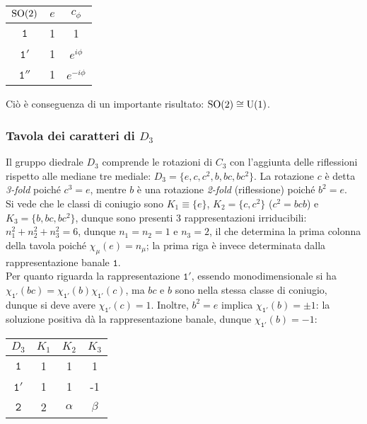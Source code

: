 \begin{table}[H]
	\centering
	\begin{tabular}{c|cc}
		$ \mathrm{SO}(2) $ & $ e $ & $ c_{\phi} $ \\
		\hline
		$ \mathtt{1} $ & 1 & 1 \\
		$ \mathtt{1}' $ & 1 & $ e^{i \phi} $ \\
		$ \mathtt{1}'' $ & 1 & $ e^{-i \phi} $
	\end{tabular}
\end{table}

Ciò è conseguenza di un importante risultato: $ \mathrm{SO}(2) \cong \mathrm{U}(1) $.

\subsubsection{Tavola dei caratteri di \texorpdfstring{$ D_3 $}{TEXT}}

Il gruppo diedrale $ D_3 $ comprende le rotazioni di $ C_3 $ con l'aggiunta delle riflessioni rispetto alle mediane tre mediale: $ D_3 = \{e,c,c^2,b,bc,bc^2\} $. La rotazione $ c $ è detta \textit{3-fold} poiché $ c^3 = e $, mentre $ b $ è una rotazione \textit{2-fold} (riflessione) poiché $ b^2 = e $.\\
Si vede che le classi di coniugio sono $ K_1 \equiv \{e\} $, $ K_2 = \{c,c^2\} $ ($ c^2 = bcb $) e $ K_3 = \{b,bc,bc^2\} $, dunque sono presenti 3 rappresentazioni irriducibili: $ n_1^2 + n_2^2 + n_3^2 = 6 $, dunque $ n_1 = n_2 = 1 $ e $ n_3 = 2 $, il che determina la prima colonna della tavola poiché $ \chi_{\mu}(e) = n_{\mu} $; la prima riga è invece determinata dalla rappresentazione banale $ \mathtt{1} $.\\
Per quanto riguarda la rappresentazione $ \mathtt{1}' $, essendo monodimensionale si ha $ \chi_{\mathtt{1}'}(bc) = \chi_{\mathtt{1}'}(b) \chi_{\mathtt{1}'}(c) $, ma $ bc $ e $ b $ sono nella stessa classe di coniugio, dunque si deve avere $ \chi_{\mathtt{1}'}(c) = 1 $. Inoltre, $ b^2 = e $ implica $ \chi_{\mathtt{1}'}(b) = \pm 1 $: la soluzione positiva dà la rappresentazione banale, dunque $ \chi_{\mathtt{1}'}(b) = -1 $:

\begin{table}[H]
	\centering
	\begin{tabular}{c|ccc}
		$ D_3 $ & $ K_1 $ & $ K_2 $ & $ K_3 $ \\
		\hline
		$ \mathtt{1} $ & 1 & 1 & 1 \\
		$ \mathtt{1}' $ & 1 & 1 & -1 \\
		$ \mathtt{2} $ & 2 & $ \alpha $ & $ \beta $
	\end{tabular}
\end{table}

